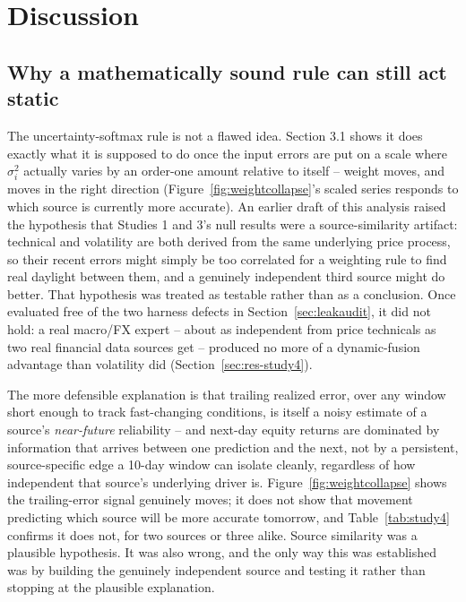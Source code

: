 \documentclass[10pt,a4paper,twocolumn]{article}
\begin{document}
\section{Discussion}

\subsection{Why a mathematically sound rule can still act static}

The uncertainty-softmax rule is not a flawed idea. Section 3.1 shows it does exactly what it is supposed to do once the input errors are put on a scale where $\sigma_i^2$ actually varies by an order-one amount relative to itself -- weight moves, and moves in the right direction (Figure~\ref{fig:weightcollapse}'s scaled series responds to which source is currently more accurate). An earlier draft of this analysis raised the hypothesis that Studies 1 and 3's null results were a source-similarity artifact: technical and volatility are both derived from the same underlying price process, so their recent errors might simply be too correlated for a weighting rule to find real daylight between them, and a genuinely independent third source might do better. That hypothesis was treated as testable rather than as a conclusion. Once evaluated free of the two harness defects in Section~\ref{sec:leakaudit}, it did not hold: a real macro/FX expert -- about as independent from price technicals as two real financial data sources get -- produced no more of a dynamic-fusion advantage than volatility did (Section~\ref{sec:res-study4}).

The more defensible explanation is that trailing realized error, over any window short enough to track fast-changing conditions, is itself a noisy estimate of a source's \emph{near-future} reliability -- and next-day equity returns are dominated by information that arrives between one prediction and the next, not by a persistent, source-specific edge a 10-day window can isolate cleanly, regardless of how independent that source's underlying driver is. Figure~\ref{fig:weightcollapse} shows the trailing-error signal genuinely moves; it does not show that movement predicting which source will be more accurate tomorrow, and Table~\ref{tab:study4} confirms it does not, for two sources or three alike. Source similarity was a plausible hypothesis. It was also wrong, and the only way this was established was by building the genuinely independent source and testing it rather than stopping at the plausible explanation.
\end{document}
